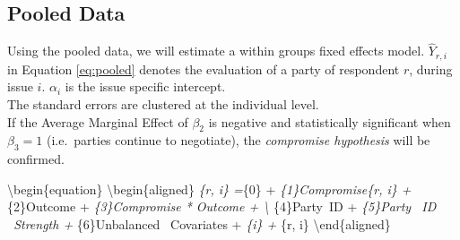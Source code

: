 \documentclass[]{article}
\newenvironment{Shaded}{\begin{snugshade}}{\end{snugshade}}
\newcommand{\DataTypeTok}[1]{\textcolor[rgb]{0.13,0.29,0.53}{#1}}
\newcommand{\DecValTok}[1]{\textcolor[rgb]{0.00,0.00,0.81}{#1}}
\newcommand{\KeywordTok}[1]{\textcolor[rgb]{0.13,0.29,0.53}{\textbf{#1}}}
\newcommand{\NormalTok}[1]{#1}
\newcommand{\OperatorTok}[1]{\textcolor[rgb]{0.81,0.36,0.00}{\textbf{#1}}}
\newcommand{\StringTok}[1]{\textcolor[rgb]{0.31,0.60,0.02}{#1}}
\begin{document}
\hypertarget{pooled-data}{%
\subsection{Pooled Data}\label{pooled-data}}

Using the pooled data, we will estimate a within groups fixed effects
model. \(\hat{Y}_{r, i}\) in Equation \ref{eq:pooled} denotes the
evaluation of a party of respondent \(r\), during issue \(i\).
\(\alpha_{i}\) is the issue specific intercept.\\
The standard errors are clustered at the individual level.\\
If the Average Marginal Effect of \(\beta_{2}\) is negative and
statistically significant when \(\beta_{3} = 1\) (i.e.~parties continue
to negotiate), the \emph{compromise hypothesis} will be confirmed.

\textbackslash{}begin\{equation\}\label{eq:pooled}
\textbackslash{}begin\{aligned\} \emph{\{r, i\} =\beta}\{0\} +
\beta\emph{\{1\}Compromise\{r, i\} + \beta}\{2\}Outcome +
\beta\emph{\{3\}Compromise * Outcome + \nonumber \textbackslash{}
\beta}\{4\}Party~ID + \beta\emph{\{5\}Party ~ID ~Strength +
\beta}\{6\}Unbalanced ~Covariates + \varepsilon\alpha\emph{\{i\} +
\varepsilon}\{r, i\} \textbackslash{}end\{aligned\}

\begin{Shaded}
\end{Shaded}
\end{document}
